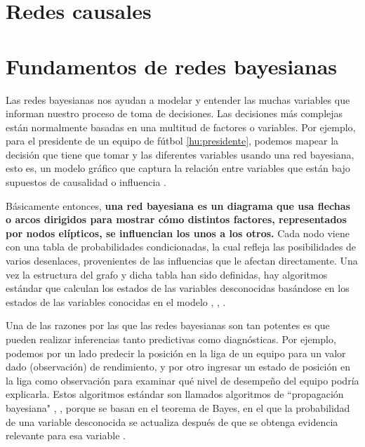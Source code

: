\section{Redes causales}

\section{Fundamentos de redes bayesianas}
Las redes bayesianas nos ayudan a modelar y entender las muchas variables que informan nuestro proceso de 
toma de decisiones. Las decisiones más complejas están normalmente basadas en una multitud de factores o 
variables. Por ejemplo, para el presidente de un equipo de fútbol \ref{hu:presidente}, podemos 
mapear la decisión que tiene que tomar y las diferentes variables usando 
una red bayesiana, esto es, un modelo gráfico que captura la relación entre variables que están bajo 
supuestos de causalidad o influencia \cite{things-to-know-BN}.

Básicamente entonces, \textbf{una red bayesiana es un diagrama que 
usa flechas o arcos dirigidos para mostrar cómo distintos factores, representados por nodos elípticos, se 
influencian los unos a los otros.} Cada nodo viene con una tabla de probabilidades condicionadas, la cual refleja las 
posibilidades de varios desenlaces, provenientes de las influencias que le afectan directamente. Una vez 
la estructura del grafo y dicha tabla han sido definidas, hay algoritmos estándar que 
calculan los estados de las variables desconocidas basándose en los estados de las variables conocidas en el
modelo \cite{learning-algorithms-BN-comparison}, \cite{BN-achilles-heel}, \cite{different-algorithmic-schemes}.

Una de las razones por las que las redes bayesianas son tan potentes es que pueden realizar inferencias 
tanto predictivas como diagnósticas. Por ejemplo, podemos por un lado predecir la posición en la liga de un equipo para 
un valor dado (observación) de rendimiento, y por otro ingresar un estado de posición en la 
liga como observación para examinar qué nivel de desempeño del equipo podría explicarla. Estos algoritmos estándar son
llamados algoritmos de ``propagación bayesiana" \cite{Cano2004}, \cite{more-algorithms}, \cite{back-prop} porque se basan en el teorema de Bayes, en el que la 
probabilidad de una variable desconocida se actualiza después de que se obtenga evidencia relevante para esa variable \cite{prop-alg}.

